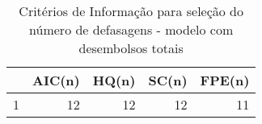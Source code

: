 \begin{table}[!htb]
\centering
\caption{Crit\'{e}rios de Informa\c{c}\~{a}o para sele\c{c}\~{a}o do n\'{u}mero de defasagens - modelo com desembolsos totais} 
\label{tab:lagselectionm-1}
\begin{tabular}{lrrrr}
  \toprule
 & AIC(n) & HQ(n) & SC(n) & FPE(n) \\ 
  \midrule
1 &  12 &  12 &  12 &  11 \\ 
   \bottomrule
\end{tabular}
\end{table}
